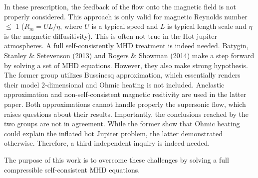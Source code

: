 \documentclass[11pt]{article}
\begin{document}
\begin{enumerate}
In these prescription, the feedback of the flow onto the magnetic field is not properly considered. This approach is only valid for magnetic Reynolds number $\leq$ 1 ($R_m = UL/\eta$, where  $U$ is a typical speed and $L$ is typical length scale and $\eta$ is the magnetic diffusitivity). This is often not true in the Hot jupiter atmospheres. A full self-consistently MHD treatment is indeed needed. Batygin, Stanley \& Setevenson (2013) and Rogers \& Showman (2014) make a step forward by solving a set of MHD equations. However, they also make strong hypothesis. The former group utilizes Bussinesq approximation, which essentially renders their model 2-dimensional and Ohmic heating is not included. Anelastic approximation and non-self-consistent magnetic resitivity are used in the latter paper. Both approximations cannot handle properly the supersonic flow, which raises questions about their results. Importantly, the conclusions reached by the two groups are not in agreement. While the former show that Ohmic heating could explain the inflated hot Jupiter problem, the latter demonstrated otherwise. Therefore, a third independent inquiry is indeed needed. 

The purpose of this work is to overcome these challenges by solving a full compressible self-consistent MHD equations. 

\end{enumerate}
\end{document}
